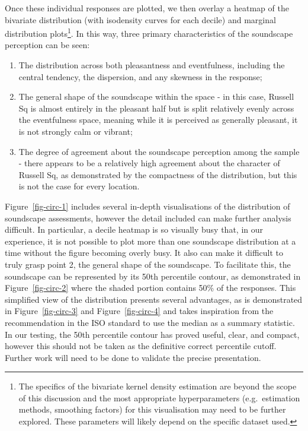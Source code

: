 \documentclass[
  authoryear,
  preprint,
  3p]{elsarticle}
\begin{document}
\begin{figure}
\end{figure}

Once these individual responses are plotted, we then overlay a heatmap
of the bivariate distribution (with isodensity curves for each decile)
and marginal distribution plots\footnote{The specifics of the bivariate
  kernel density estimation \citep{silverman2018density} are beyond the
  scope of this discussion and the most appropriate hyperparameters
  (e.g.~estimation methods, smoothing factors) for this visualisation
  may need to be further explored. These parameters will likely depend
  on the specific dataset used.}. In this way, three primary
characteristics of the soundscape perception can be seen:

\begin{enumerate}
\def\labelenumi{\arabic{enumi}.}
\item
  The distribution across both pleasantness and eventfulness, including
  the central tendency, the dispersion, and any skewness in the
  response;
\item
  The general shape of the soundscape within the space - in this case,
  Russell Sq is almost entirely in the pleasant half but is split
  relatively evenly across the eventfulness space, meaning while it is
  perceived as generally pleasant, it is not strongly calm or vibrant;
\item
  The degree of agreement about the soundscape perception among the
  sample - there appears to be a relatively high agreement about the
  character of Russell Sq, as demonstrated by the compactness of the
  distribution, but this is not the case for every location.
\end{enumerate}

Figure~\ref{fig-circ-1} includes several in-depth visualisations of the
distribution of soundscape assessments, however the detail included can
make further analysis difficult. In particular, a decile heatmap is so
visually busy that, in our experience, it is not possible to plot more
than one soundscape distribution at a time without the figure becoming
overly busy. It also can make it difficult to truly grasp point 2, the
general shape of the soundscape. To facilitate this, the soundscape can
be represented by its 50th percentile contour, as demonstrated in
Figure~\ref{fig-circ-2} where the shaded portion contains 50\% of the
responses. This simplified view of the distribution presents several
advantages, as is demonstrated in Figure~\ref{fig-circ-3} and
Figure~\ref{fig-circ-4} and takes inspiration from the recommendation in
the ISO standard to use the median as a summary statistic. In our
testing, the 50th percentile contour has proved useful, clear, and
compact, however this should not be taken as the definitive correct
percentile cutoff. Further work will need to be done to validate the
precise presentation.
\end{document}
